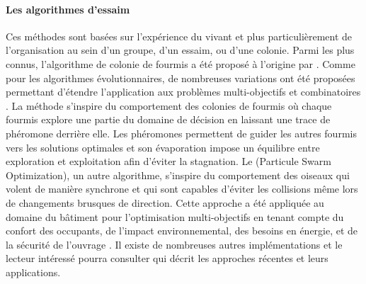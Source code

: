 \paragraph{Les algorithmes d’essaim} %
\label{par:les_algorithmes_d_essaim}
Ces méthodes sont basées sur l’expérience du vivant et plus particulièrement de
l’organisation au sein d’un groupe, d’un essaim, ou d’une colonie. Parmi les plus connus,
l’algorithme de colonie de fourmis a été proposé à l’origine par \textcite{Colorni1992509}.
Comme pour les algorithmes évolutionnaires, de nombreuses variations ont été proposées
permettant d’étendre l’application aux problèmes multi-objectifs et combinatoires
\parencite{MichaelGuntsch2003,Shea2006627}.
La méthode s’inspire du comportement des colonies de fourmis où chaque fourmis
explore une partie du domaine de décision en laissant une trace de phéromone
derrière elle. Les phéromones permettent de guider les autres fourmis vers les
solutions optimales et son évaporation impose un équilibre entre exploration et
exploitation afin d’éviter la stagnation.
Le  (Particule Swarm Optimization), un autre algorithme, s’inspire du
comportement des oiseaux qui volent de manière synchrone et qui sont capables
d’éviter les collisions même lors de changements brusques de direction. Cette
approche a été appliquée au domaine du bâtiment pour l’optimisation multi-objectifs
en tenant compte du confort des occupants, de l’impact environnemental,
des besoins en énergie, et de la sécurité de l’ouvrage \parencite{Armand-Decker2015}.
Il existe de nombreuses autres implémentations et le lecteur intéressé pourra
consulter \textcite{Aboul-EllaHassanien2015} qui décrit les approches récentes et
leurs applications.


